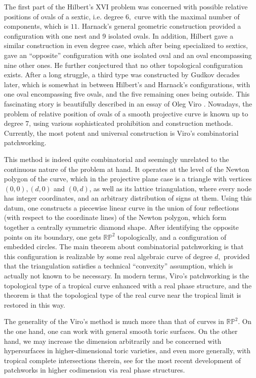 \documentclass[pdflatex,sn-mathphys-num]{sn-jnl}%
\theoremstyle{thmstyleone}%
\theoremstyle{thmstyletwo}%
\theoremstyle{thmstylethree}%
\newcommand{\RP}{\mathbb{R}\mathbb{P}}
\begin{document}
The first part of the Hilbert's XVI problem was concerned with possible relative positions of ovals of a sextic, i.e. degree $6,$ curve with the maximal number of components, which is $11$. Harnack's general geometric construction provided a configuration with one nest and 9 isolated ovals. In addition, Hilbert gave a similar construction in even degree case, which after being specialized to sextics, gave an ``opposite'' configuration with one isolated oval and an oval encompassing nine other ones. He further conjectured that no other topological configuration exists. After a long struggle, a third type was constructed by Gudkov decades later, which is somewhat in between Hilbert's and Harnack's configurations, with one oval encompassing five ovals, and the five remaining ones being outside. This fascinating story is beautifully described in an essay of Oleg Viro \cite{Viro08}. Nowadays, the problem of relative position of ovals of a smooth projective curve is known up to degree $7$, using various sophisticated prohibition and construction methods. Currently, the most potent and universal construction is Viro's combinatorial patchworking. 

This method is indeed quite combinatorial and seemingly unrelated to the continuous nature of the problem at hand. It operates at the level of the Newton polygon of the curve, which in the projective plane case is a triangle with vertices $(0, 0), (d, 0)$ and $(0, d)$, as well as its lattice triangulation, where every node has integer coordinates, and an arbitrary distribution of signs at them. Using this datum, one constructs a piecewise linear curve in the union of four reflections (with respect to the coordinate lines) of the Newton polygon, which form together a centrally symmetric diamond shape. After identifying the opposite points on its boundary, one gets $\RP^2$ topologically, and a configuration of embedded circles. The main theorem about combinatorial patchworking is that this configuration is realizable by some real algebraic curve of degree $d,$ provided that the triangulation satisfies a technical ``convexity'' assumption, which is actually not known to be necessary. In modern terms, Viro's patchworking is the topological type of a tropical curve enhanced with a real phase structure, and the theorem is that the topological type of the real curve near the tropical limit is restored in this way. 

The generality of the Viro's method is much more than that of curves in $\RP^2$. On the one hand, one can work with general smooth toric surfaces. On the other hand, we may increase the dimension arbitrarily and be concerned with hypersurfaces in higher-dimensional toric varieties, and even more generally, with tropical complete intersections therein, see \cite{RRS25} for the most recent development of patchworks in higher codimension via real phase structures.
\end{document}
